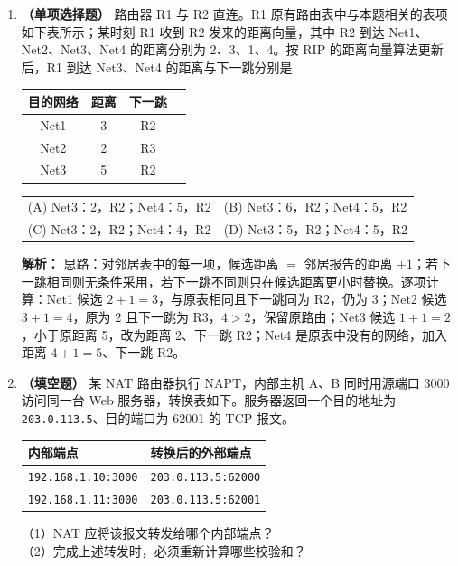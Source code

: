 \begin{enumerate}
\item \textbf{（单项选择题）} 路由器 R1 与 R2 直连。R1 原有路由表中与本题相关的表项如下表所示；某时刻 R1 收到 R2 发来的距离向量，其中 R2 到达 Net1、Net2、Net3、Net4 的距离分别为 2、3、1、4。按 RIP 的距离向量算法更新后，R1 到达 Net3、Net4 的距离与下一跳分别是
\begin{center}
\begin{tabular}{cccc}
\toprule
目的网络 & 距离 & 下一跳 \\
\midrule
Net1 & 3 & R2 \\
Net2 & 2 & R3 \\
Net3 & 5 & R2 \\
\bottomrule
\end{tabular}
\end{center}
\begin{center}
\begin{tabular}{ll}
(A) Net3：2，R2；Net4：5，R2 & (B) Net3：6，R2；Net4：5，R2 \\[4pt]
(C) Net3：2，R2；Net4：4，R2 & (D) Net3：5，R2；Net4：5，R2
\end{tabular}
\end{center}

\ifshowsolutions\par\noindent\textbf{解析：} 思路：对邻居表中的每一项，候选距离 $=$ 邻居报告的距离 $+1$；若下一跳相同则无条件采用，若下一跳不同则只在候选距离更小时替换。逐项计算：Net1 候选 $2+1=3$，与原表相同且下一跳同为 R2，仍为 3；Net2 候选 $3+1=4$，原为 2 且下一跳为 R3，$4>2$，保留原路由；Net3 候选 $1+1=2$，小于原距离 5，改为距离 2、下一跳 R2；Net4 是原表中没有的网络，加入距离 $4+1=5$、下一跳 R2。\else \answerarea[6] \fi

\item \textbf{（填空题）} 某 NAT 路由器执行 NAPT，内部主机 A、B 同时用源端口 3000 访问同一台 Web 服务器，转换表如下。服务器返回一个目的地址为 \texttt{203.0.113.5}、目的端口为 62001 的 TCP 报文。
\begin{center}
\begin{tabular}{ll}
\toprule
内部端点 & 转换后的外部端点 \\
\midrule
\texttt{192.168.1.10:3000} & \texttt{203.0.113.5:62000} \\
\texttt{192.168.1.11:3000} & \texttt{203.0.113.5:62001} \\
\bottomrule
\end{tabular}
\end{center}
（1）NAT 应将该报文转发给哪个内部端点？\\[2pt]
（2）完成上述转发时，必须重新计算哪些校验和？


\end{enumerate}
